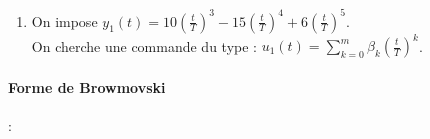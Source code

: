 \documentclass[../main.tex]{subfiles}
\begin{document}
\begin{enumerate}
\begin{enumerate}
Changement de coordonnées $M \in \mathbb{R}^{2x2}$ avec $M = \begin{pmatrix}m_1&m_2\end{pmatrix}$
\begin{align*}
M^{-1}AM = A_c &\Leftrightarrow AM = MA_c\\
&\Leftrightarrow\begin{pmatrix}
Am_1& Am_2
\end{pmatrix} = \begin{pmatrix}
m_1&m_2
\end{pmatrix}.\begin{pmatrix}
0&1\\-2&-3
\end{pmatrix}= \begin{pmatrix}
-2m_2& m_1 - 3m_2
\end{pmatrix}\\
&\Leftrightarrow \left\{ \begin{matrix}
Am_1 = -2m_2\\
Am_2 = m_1 - 3m_2
\end{matrix}\right.\\
&\Leftrightarrow \left \{ \begin{matrix}
 Am_1 = -2m_2\\
 (A+3\mathbf{1}_2)m_2 = m_1
\end{matrix}\right.
\intertext{or, $M^{-1}B = B_c\Leftrightarrow B=MB_c=m_2$, donc :}
M &= \begin{pmatrix}
B & (A+3\mathbf{1}_2)B
\end{pmatrix}
\intertext{d'où : }
M &= \begin{pmatrix}-5&-1\\-4&-1\end{pmatrix}
\end{align*}

Il est inutile de calculer $M^{-1}$ pour le calcul de la forme canonique. Car $C_c = C_1M = \begin{pmatrix}0&1\end{pmatrix}$ et, $D_c = D_1 = 0$
\item On impose $y_1(t) = 10\left(\frac{t}{T}\right)^3 - 15\left(\frac{t}{T}\right)^4 + 6\left(\frac{t}{T}\right)^5$.\\
On cherche une commande du type : $u_1(t) = \sum_{k=0}^m \beta_k \left(\frac{t}{T}\right)^k$.\\

\end{enumerate}
\paragraph{Forme de Browmovski }:


\end{enumerate}
\end{document}
